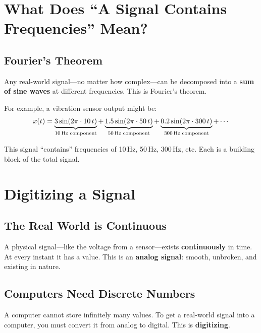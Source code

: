\documentclass[12pt,a4paper]{article}
\begin{document}
\section{What Does ``A Signal Contains Frequencies'' Mean?}

\subsection{Fourier's Theorem}

Any real-world signal---no matter how complex---can be decomposed into a \textbf{sum of sine waves} at different frequencies. This is Fourier's theorem.

For example, a vibration sensor output might be:
\begin{equation}
    x(t) = \underbrace{3\sin(2\pi \cdot 10\, t)}_{\text{10\,Hz component}}
          + \underbrace{1.5\sin(2\pi \cdot 50\, t)}_{\text{50\,Hz component}}
          + \underbrace{0.2\sin(2\pi \cdot 300\, t)}_{\text{300\,Hz component}}
          + \cdots
\end{equation}

This signal ``contains'' frequencies of 10\,Hz, 50\,Hz, 300\,Hz, etc. Each is a building block of the total signal.

\section{Digitizing a Signal}

\subsection{The Real World is Continuous}

A physical signal---like the voltage from a sensor---exists \textbf{continuously} in time. At every instant it has a value. This is an \textbf{analog signal}: smooth, unbroken, and existing in nature.

\subsection{Computers Need Discrete Numbers}

A computer cannot store infinitely many values. To get a real-world signal into a computer, you must convert it from analog to digital. This is \textbf{digitizing}.
\end{document}
